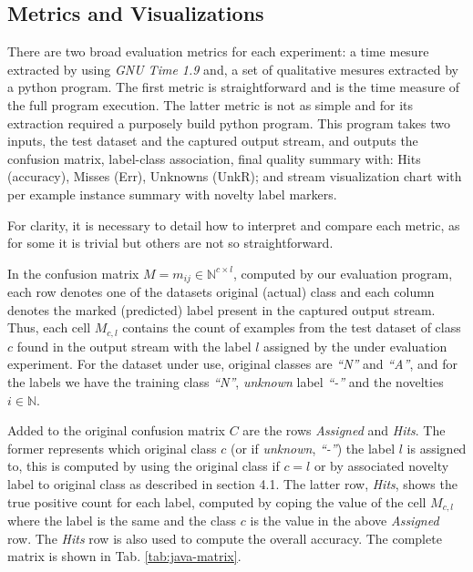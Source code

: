 



\subsection{Metrics and Visualizations}

There are two broad evaluation metrics for each experiment:
a time mesure extracted by using \emph{GNU Time 1.9} and,
a set of qualitative mesures extracted by a python program.
The first metric is straightforward and is the time measure of the full program execution.
The latter metric is not as simple and for its extraction required a
purposely build python program.
This program takes two inputs, the test dataset and the captured output stream,
and outputs the confusion matrix, label-class association,
final quality summary with: Hits (accuracy), Misses (Err), Unknowns (UnkR); and
stream visualization chart with per example instance summary with novelty label markers.

For clarity, it is necessary to detail how to interpret and compare each metric,
as for some it is trivial but others are not so straightforward.

In the confusion matrix $M = m_{ij} \in \mathbb{N} ^{c \times{} l}$,
computed by our evaluation program,
each row denotes one of the datasets original (actual) class
and each column denotes the marked (predicted) label present in the captured output stream.
Thus, each cell $M_{c, l}$ contains the count of examples from the test dataset of class $c$
found in the output stream with the label $l$ assigned by the under evaluation experiment.
For the dataset under use, original classes are \emph{``N''} and \emph{``A''}, and
for the labels we have the training class \emph{``N''}, \emph{unknown} label \emph{``-''} and
the novelties $i \in \mathbb{N}$.

Added to the original confusion matrix $C$ are the rows \emph{Assigned} and
\emph{Hits}.
The former represents which original class $c$ (or if \emph{unknown}, \emph{``-''}) the
label $l$ is assigned to, this is computed by using the original class if
$c = l$ or by associated novelty label to original class as described in
\cite{DeFaria2015} section 4.1.
The latter row, \emph{Hits}, shows the true positive count for each label,
computed by coping the value of the cell $M_{c, l}$ where the label is the same
and the class $c$ is the value in the above \emph{Assigned} row.
The \emph{Hits} row is also used to compute the overall accuracy.
The complete matrix is shown in Tab. \ref{tab:java-matrix}.

